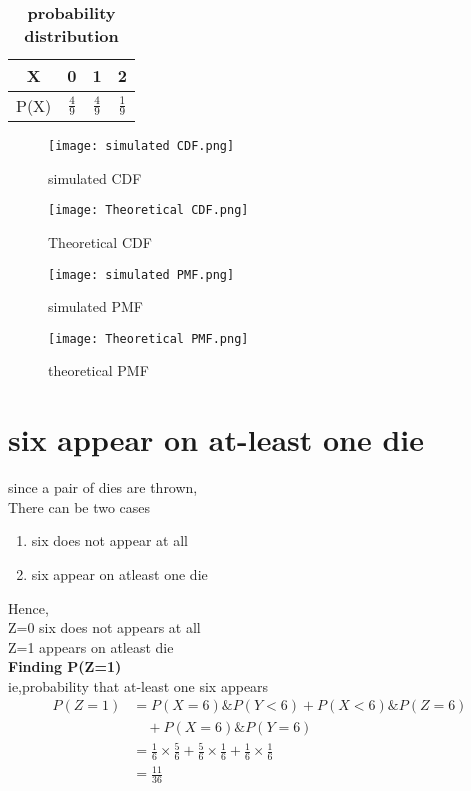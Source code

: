 \documentclass[11pt,a4paper,twocolumn]{article}
\begin{document}
\begin{table}[ht]
    \centering
    \begin{tabular}{|c|c|c|c|}
    \hline
    X&0&1&2\\
    \hline
    P(X)&$\frac{4}{9}$&$\frac{4}{9}$&$\frac{1}{9}$\\
    \hline
    \end{tabular}
    \caption{\textbf{probability distribution}}
\end{table}
\begin{figure}[h!]
    \centering
    \texttt{[image: simulated CDF.png]}
    \caption{simulated CDF}
\end{figure}
\begin{figure}[h!]
    \centering
    \texttt{[image: Theoretical CDF.png]} 
    \caption{Theoretical CDF}
\end{figure}
\begin{figure}[h!]
    \centering
    \texttt{[image: simulated PMF.png]} 
    \caption{simulated PMF}
\end{figure}
\begin{figure}[h!]
    \centering
    \texttt{[image: Theoretical PMF.png]}
    \caption{theoretical PMF}
\end{figure}
\section{six appear on at-least one die}
since a pair of dies are thrown,\\
There can be two cases
\begin{enumerate}
    \item six does not appear at all
    \item six appear on atleast one die
\end{enumerate}
Hence,\\ Z=0 six does not appears at all\\
Z=1 appears on atleast die
\\ \textbf{Finding P(Z=1)}\\
ie,probability that at-least one six appears
\begin{align*}
P(Z=1)&=P(X=6)\&P(Y<6)+P(X<6)\&P(Z=6)\\
&\quad +P(X=6)\&P(Y=6)\\
&=\frac{1}{6}\times\frac{5}{6}+\frac{5}{6}\times\frac{1}{6}+\frac{1}{6}\times\frac{1}{6}\\
&=\frac{11}{36}
\end{align*}
\end{document}

